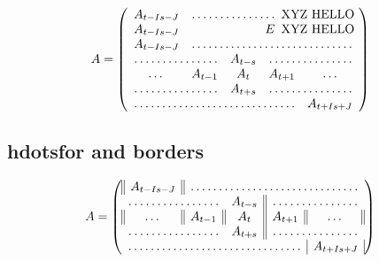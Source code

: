 \documentclass[11pt]{revtex4-1}
\begin{document}



\begin{equation}
  A = \left(\begin{array}{ccccccc}
    A_{t-I s-J} & \hdotsfor{4} XYZ HELLO \\
    A_{t-I s-J} & \multicolumn{4}{r}{E} XYZ HELLO \\
    A_{t-I s-J} & \hdotsfor{4} \\
    \hdotsfor{2} & A_{t-s} & \hdotsfor{2} \\
    \dots & A_{t-1} & A_t & A_{t+1} & \dots \\
    \hdotsfor{2} & A_{t+s} & \hdotsfor{2} \\
    \hdotsfor{4} & A_{t+I s+J}
  \end{array}\right)
\end{equation}

\subsection{hdotsfor and borders}


\begin{equation}
  A = \left(\begin{array}{||c||c||c||c||c||}
    A_{t-I s-J} & \hdotsfor{4} \\
    \hdotsfor{2} & A_{t-s} & \hdotsfor{2} \\
    \dots & A_{t-1} & A_t & A_{t+1} & \dots \\
    \hdotsfor{2} & A_{t+s} & \hdotsfor{2} \\
    \hdotsfor{4} & \multicolumn{1}{|c|}{A_{t+I s+J}}
  \end{array}\right)
\end{equation}
\end{document}
